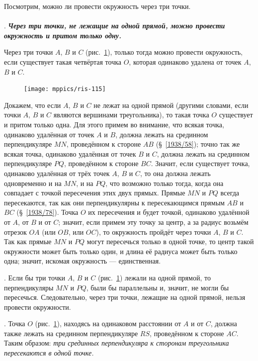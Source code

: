 \documentclass[oneside]{book}
\begin{document}
Посмотрим, можно ли провести окружность через три точки.

\paragraph{}\label{1938/104}
.
\textbf{\emph{Через три точки, не лежащие на одной прямой, можно провести окружность и притом только одну.}}

Через три точки $A$, $B$ и $C$ (рис.~\ref{1938/ris-115}), только тогда можно провести окружность, если существует такая четвёртая точка $O$, которая одинаково удалена от точек $A$, $B$ и $C$.

\begin{figure}
\centering
\texttt{[image: mppics/ris-115]}
\caption{}\label{1938/ris-115}
\end{figure}

Докажем, что если $A$, $B$ и $C$ не лежат на одной прямой 
(другими словами, если точки $A$, $B$ и $C$ являются вершинами треугольника),
то такая точка $O$ существует и притом только одна.
Для этого примем во внимание, что всякая точка, одинаково удалённая от точек $A$ и $B$, должна лежать на срединном перпендикуляре $MN$, проведённом к стороне $AB$ (§~\ref{1938/58}); 
точно так же всякая точка, одинаково удалённая от точек $B$ и $C$, должна лежать на срединном перпендикуляре $PQ$, проведённом к стороне $BC$.
Значит, если существует точка, одинаково удалённая от трёх точек $A$, $B$ и $C$, то она должна лежать одновременно и на $MN$, и на $PQ$, что возможно только тогда, когда она совпадает с точкой пересечения этих двух прямых.
Прямые $MN$ и $PQ$ всегда пересекаются, так как они перпендикулярны к пересекающимся прямым $AB$ и $BC$ (§~\ref{1938/78}).
Точка $O$ их пересечения и будет точкой, одинаково удалённой от $A$, от $B$ и от $C$;
значит, если примем эту точку за центр, а за радиус возьмём отрезок $OA$ (или $OB$, или $OC$), то окружность пройдёт через точки $A$, $B$ и $C$.
Так как прямые $MN$ и $PQ$ могут пересечься только в одной точке, то центр такой окружности может быть только один, и длина её радиуса может быть только одна;
значит, искомая окружность — единственная.

\smallskip
{}.
Если бы три точки $A$, $B$ и $C$ (рис.~\ref{1938/ris-115}) лежали на одной прямой, то перпендикуляры $MN$ и $PQ$, были бы параллельны и, значит, не могли бы пересечься.
Следовательно, через три точки, лежащие на одной прямой, нельзя провести окружности.

\smallskip
{}.
Точка $O$ (рис.~\ref{1938/ris-115}), находясь на одинаковом расстоянии от $A$ и от $C$, должна также лежать на срединном перпендикуляре $RS$, проведённом к стороне $AC$. 
Таким образом:
\emph{три срединных перпендикуляра к сторонам треугольника пересекаются в одной точке.}
\end{document}
